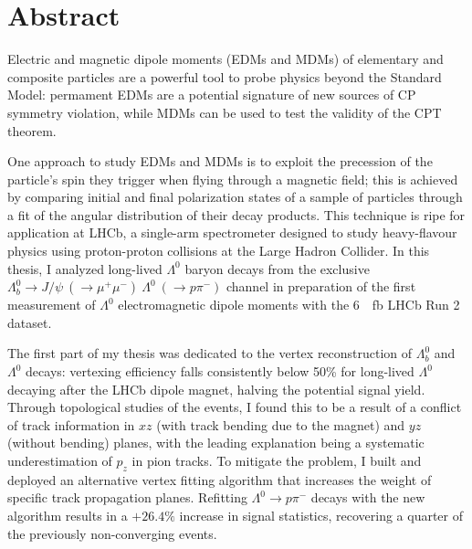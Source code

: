 \documentclass[12pt,a4paper]{book}
\renewcommand{\chaptermark}[1]{\markboth{#1}{}}
\newcommand{\demonstratorfull}{$\Lambda_b^0 \rightarrow J/\psi~(\rightarrow \mu^+ \mu^-)~\Lambda^0~(\rightarrow p\pi^-)$\xspace}
\newcommand{\lz}{$\Lambda^0$\xspace}
\newcommand{\lbz}{$\Lambda_b^0$\xspace}
\newcommand{\lambdadecay}{$\Lambda^0 \rightarrow p\pi^-$\xspace}
\begin{document}





\mainmatter

\chapter*{Abstract}

Electric and magnetic dipole moments (EDMs and MDMs) of elementary and composite particles are a powerful tool to probe physics beyond the Standard Model:
permament EDMs are a potential signature of new sources of CP symmetry violation, while MDMs can be used to test the validity of the CPT theorem.

One approach to study EDMs and MDMs is to exploit the precession of the particle's spin they trigger when flying through a magnetic field;
this is achieved by comparing initial and final polarization states of a sample of particles through a fit of the angular distribution of their decay products.
This technique is ripe for application at LHCb, a single-arm spectrometer designed to study heavy-flavour physics using proton-proton collisions at the Large Hadron Collider.
In this thesis, I analyzed long-lived \lz baryon decays from the exclusive \demonstratorfull channel in preparation of the first measurement of \lz electromagnetic dipole moments with the \SI{6}{\per\femto\barn} LHCb Run 2 dataset.

The first part of my thesis was dedicated to the vertex reconstruction of \lbz and \lz decays:
vertexing efficiency falls consistently below 50\% for long-lived \lz decaying after the LHCb dipole magnet, halving the potential signal yield.
Through topological studies of the events, I found this to be a result of a conflict of track information in $xz$ (with track bending due to the magnet) and $yz$ (without bending) planes, with the leading explanation being a systematic underestimation of $p_z$ in pion tracks.
To mitigate the problem, I built and deployed an alternative vertex fitting algorithm that increases the weight of specific track propagation planes.
Refitting \lambdadecay decays with the new algorithm results in a $+26.4\%$ increase in signal statistics, recovering a quarter of the previously non-converging events.
\end{document}
